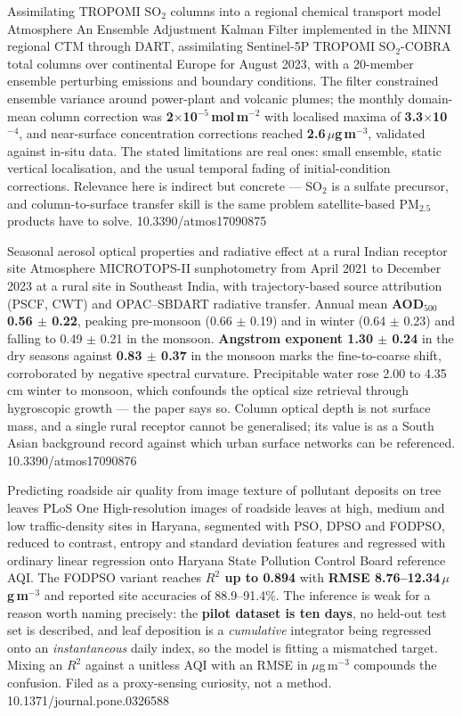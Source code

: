 \documentclass[10pt]{article}
\begin{document}
{Assimilating TROPOMI SO$_2$ columns into a regional chemical transport model}
{Atmosphere}
{An Ensemble Adjustment Kalman Filter implemented in the MINNI regional CTM through DART,
assimilating Sentinel-5P TROPOMI SO$_2$-COBRA total columns over continental Europe for
August 2023, with a 20-member ensemble perturbing emissions and boundary conditions. The
filter constrained ensemble variance around power-plant and volcanic plumes; the monthly
domain-mean column correction was \textbf{2$\times$10$^{-5}$\,mol\,m$^{-2}$} with localised
maxima of \textbf{3.3$\times$10$^{-4}$}, and near-surface concentration corrections reached
\textbf{2.6\,$\mu$g\,m$^{-3}$}, validated against in-situ data. The stated limitations are
real ones: small ensemble, static vertical localisation, and the usual temporal fading of
initial-condition corrections. Relevance here is indirect but concrete --- SO$_2$ is a
sulfate precursor, and column-to-surface transfer skill is the same problem satellite-based
PM$_{2.5}$ products have to solve.}
{10.3390/atmos17090875}

{Seasonal aerosol optical properties and radiative effect at a rural Indian receptor site}
{Atmosphere}
{MICROTOPS-II sunphotometry from April 2021 to December 2023 at a rural site in Southeast
India, with trajectory-based source attribution (PSCF, CWT) and OPAC--SBDART radiative
transfer. Annual mean \textbf{AOD$_{500}$ 0.56 $\pm$ 0.22}, peaking pre-monsoon
(0.66 $\pm$ 0.19) and in winter (0.64 $\pm$ 0.23) and falling to 0.49 $\pm$ 0.21 in the
monsoon. \textbf{Angstrom exponent 1.30 $\pm$ 0.24} in the dry seasons against
\textbf{0.83 $\pm$ 0.37} in the monsoon marks the fine-to-coarse shift, corroborated by
negative spectral curvature. Precipitable water rose 2.00 to 4.35\,cm winter to monsoon,
which confounds the optical size retrieval through hygroscopic growth --- the paper says so.
Column optical depth is not surface mass, and a single rural receptor cannot be generalised;
its value is as a South Asian background record against which urban surface networks can be
referenced.}
{10.3390/atmos17090876}

{Predicting roadside air quality from image texture of pollutant deposits on tree leaves}
{PLoS One}
{High-resolution images of roadside leaves at high, medium and low traffic-density sites in
Haryana, segmented with PSO, DPSO and FODPSO, reduced to contrast, entropy and standard
deviation features and regressed with ordinary linear regression onto Haryana State
Pollution Control Board reference AQI. The FODPSO variant reaches \textbf{$R^2$ up to 0.894}
with \textbf{RMSE 8.76--12.34\,$\mu$g\,m$^{-3}$} and reported site accuracies of 88.9--91.4\%.
The inference is weak for a reason worth naming precisely: the \textbf{pilot dataset is ten
days}, no held-out test set is described, and leaf deposition is a \emph{cumulative}
integrator being regressed onto an \emph{instantaneous} daily index, so the model is fitting
a mismatched target. Mixing an $R^2$ against a unitless AQI with an RMSE in
$\mu$g\,m$^{-3}$ compounds the confusion. Filed as a proxy-sensing curiosity, not a method.}
{10.1371/journal.pone.0326588}
\end{document}
